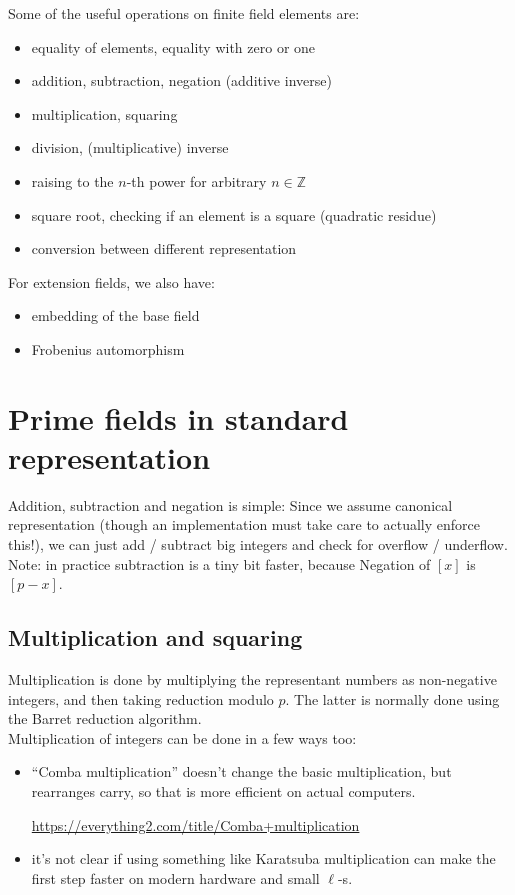 \documentclass[12pt,draft,a4paper,openany,oneside]{amsbook}
\def\Z{\mathbb{Z}}
\theoremstyle{plain}
\theoremstyle{definition}
\begin{document}
Some of the useful operations on finite field elements are:
\begin{itemize}
\item equality of elements, equality with zero or one
\item addition, subtraction, negation (additive inverse)
\item multiplication, squaring
\item division, (multiplicative) inverse
\item raising to the $n$-th power for arbitrary $n\in\Z$
\item square root, checking if an element is a square (quadratic residue)
\item conversion between different representation\\
\end{itemize}

For extension fields, we also have:
\begin{itemize}
\item embedding of the base field
\item Frobenius automorphism
\end{itemize}


\section{Prime fields in standard representation}

Addition, subtraction and negation is simple: Since we assume canonical representation
(though an implementation must take care to actually enforce this!), we can
just add / subtract big integers and check for overflow / underflow. Note:
in practice subtraction is a tiny bit faster, because 
Negation of $[x]$ is $[p-x]$.

\subsection{Multiplication and squaring}
Multiplication is done by multiplying the representant numbers as non-negative 
integers, and then taking reduction modulo $p$.
The latter is normally done using the Barret reduction algorithm.\\

Multiplication of integers can be done in a few ways too:
\begin{itemize}
\item ``Comba multiplication'' doesn't change the basic multiplication, but
rearranges carry, so that is more efficient on actual computers.

\url{https://everything2.com/title/Comba+multiplication}
\item it's not clear if using something like Karatsuba multiplication can make
the first step faster on modern hardware and small $\ell$-s.\\
\end{itemize}
\end{document}
